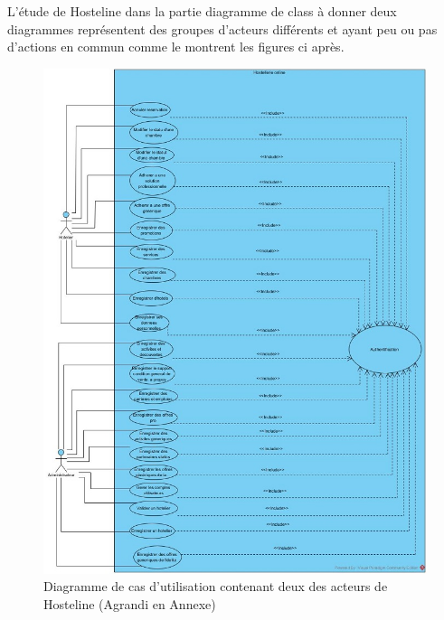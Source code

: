 \cleardoublepage

L’étude de Hosteline dans la partie diagramme de class à donner deux diagrammes représentent des groupes d’acteurs différents et ayant peu ou pas d’actions en commun comme le montrent les figures ci après.

\begin{figure}[!htbp]
	\begin{center}
		\includegraphics[scale=0.8]{images/diag_use_case2.jpg}
	\caption{Diagramme de cas d'utilisation contenant deux des acteurs de Hosteline (Agrandi en Annexe)}
		\label{use_case_diagramme_one}
	\end{center}
\end{figure}

